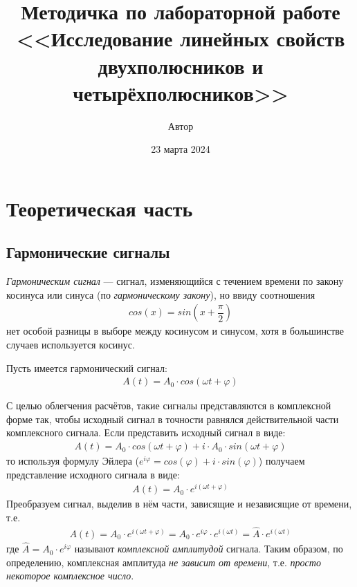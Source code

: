 \documentclass[a4paper, usenames, dvipsnames]{article}
\title{Методичка по лабораторной работе\\<<Исследование линейных свойств двухполюсников и четырёхполюсников>>}
\author{Автор}
\date{23 марта 2024}
\begin{document}
\maketitle

\section*{\centering Теоретическая часть}

\subsection*{Гармонические сигналы}

{\it Гармоническим сигнал} --- сигнал, изменяющийся с течением времени
по закону косинуса или синуса (по {\it гармоническому закону}),
но ввиду соотношения
\begin{gather*}
    cos(x) = sin\left(x + \dfrac{\pi}{2}\right)
\end{gather*}
нет особой разницы в выборе между косинусом и синусом,
хотя в большинстве случаев используется косинус.

Пусть имеется гармонический сигнал:
\begin{gather*}
    A(t) = A_0 \cdot cos(\omega t + \varphi)
\end{gather*}

С целью облегчения расчётов,
такие сигналы представляются в комплексной форме так,
чтобы исходный сигнал в точности равнялся действительной части комплексного сигнала.
Если представить исходный сигнал в виде:
\begin{gather*}
    A(t) = A_0 \cdot cos(\omega t + \varphi) + i \cdot A_0 \cdot sin(\omega t + \varphi)
\end{gather*}
то используя формулу Эйлера ($e^{i\varphi} = cos(\varphi) + i \cdot sin(\varphi)$)
получаем представление исходного сигнала в виде:
\begin{gather*}
    A(t) = A_0 \cdot e^{i(\omega t + \varphi)}
\end{gather*}
Преобразуем сигнал, выделив в нём части,
зависящие и независящие от времени, т.е.
\begin{gather*}
    A(t) = A_0 \cdot e^{i(\omega t + \varphi)} =
    A_0 \cdot e^{i\varphi} \cdot e^{i(\omega t)} =
    \hat{A} \cdot e^{i(\omega t)}
\end{gather*}
где $\hat{A} = A_0 \cdot e^{i\varphi}$ называют {\it комплексной амплитудой} сигнала.
Таким образом, по определению, комплексная амплитуда {\it не зависит от времени},
т.е. {\it просто некоторое комплексное число}.
\end{document}

